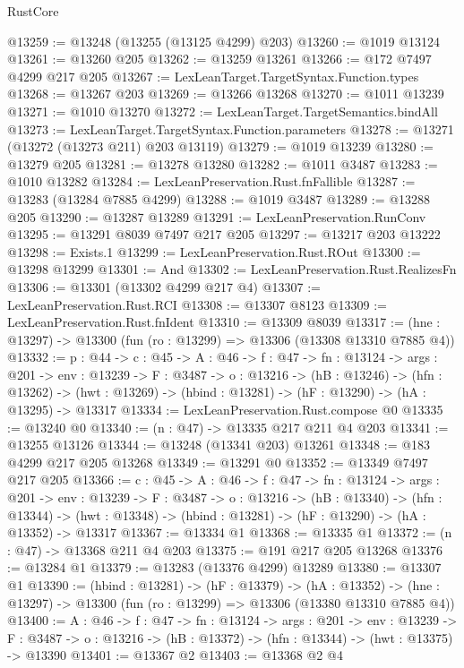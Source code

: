 \begin{lexlean}{RustCore}
\begin{coremodule}
@13259 := @13248 (@13255 (@13125 @4299) @203)
@13260 := @1019 @13124
@13261 := @13260 @205
@13262 := @13259 @13261
@13266 := @172 @7497 @4299 @217 @205
@13267 := LexLeanTarget.TargetSyntax.Function.types
@13268 := @13267 @203
@13269 := @13266 @13268
@13270 := @1011 @13239
@13271 := @1010 @13270
@13272 := LexLeanTarget.TargetSemantics.bindAll
@13273 := LexLeanTarget.TargetSyntax.Function.parameters
@13278 := @13271 (@13272 (@13273 @211) @203 @13119)
@13279 := @1019 @13239
@13280 := @13279 @205
@13281 := @13278 @13280
@13282 := @1011 @3487
@13283 := @1010 @13282
@13284 := LexLeanPreservation.Rust.fnFallible
@13287 := @13283 (@13284 @7885 @4299)
@13288 := @1019 @3487
@13289 := @13288 @205
@13290 := @13287 @13289
@13291 := LexLeanPreservation.RunConv
@13295 := @13291 @8039 @7497 @217 @205
@13297 := @13217 @203 @13222
@13298 := Exists.{1}
@13299 := LexLeanPreservation.Rust.ROut
@13300 := @13298 @13299
@13301 := And
@13302 := LexLeanPreservation.Rust.RealizesFn
@13306 := @13301 (@13302 @4299 @217 @4)
@13307 := LexLeanPreservation.Rust.RCI
@13308 := @13307 @8123
@13309 := LexLeanPreservation.Rust.fnIdent
@13310 := @13309 @8039
@13317 := (hne : @13297) -> @13300 (fun (ro : @13299) => @13306 (@13308 @13310 @7885 @4))
@13332 := {p : @44} ->
  {c : @45} ->
  {A : @46} ->
  {f : @47} ->
  {fn : @13124} ->
  {args : @201} ->
  {env : @13239} ->
  {F : @3487} ->
  {o : @13216} ->
  (hB : @13246) ->
  (hfn : @13262) -> (hwt : @13269) -> (hbind : @13281) -> (hF : @13290) -> (hA : @13295) -> @13317
@13334 := LexLeanPreservation.Rust.compose @0
@13335 := @13240 @0
@13340 := (n : @47) -> @13335 @217 @211 @4 @203
@13341 := @13255 @13126
@13344 := @13248 (@13341 @203) @13261
@13348 := @183 @4299 @217 @205 @13268
@13349 := @13291 @0
@13352 := @13349 @7497 @217 @205
@13366 := {c : @45} ->
  {A : @46} ->
  {f : @47} ->
  {fn : @13124} ->
  {args : @201} ->
  {env : @13239} ->
  {F : @3487} ->
  {o : @13216} ->
  (hB : @13340) ->
  (hfn : @13344) -> (hwt : @13348) -> (hbind : @13281) -> (hF : @13290) -> (hA : @13352) -> @13317
@13367 := @13334 @1
@13368 := @13335 @1
@13372 := (n : @47) -> @13368 @211 @4 @203
@13375 := @191 @217 @205 @13268
@13376 := @13284 @1
@13379 := @13283 (@13376 @4299) @13289
@13380 := @13307 @1
@13390 := (hbind : @13281) ->
  (hF : @13379) ->
  (hA : @13352) -> (hne : @13297) -> @13300 (fun (ro : @13299) => @13306 (@13380 @13310 @7885 @4))
@13400 := {A : @46} ->
  {f : @47} ->
  {fn : @13124} ->
  {args : @201} ->
  {env : @13239} ->
  {F : @3487} -> {o : @13216} -> (hB : @13372) -> (hfn : @13344) -> (hwt : @13375) -> @13390
@13401 := @13367 @2
@13403 := @13368 @2 @4

\end{coremodule}
\end{lexlean}
